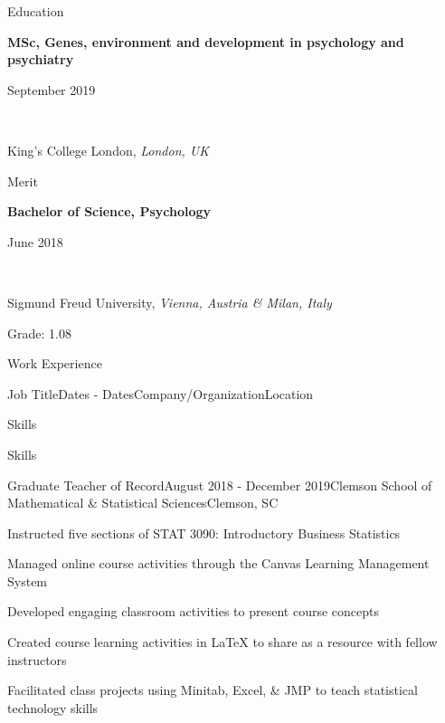 \documentclass{resume2} %
\newcommand\textbox[1]{%
  \parbox{.48\textwidth}{#1}%
}
\begin{document}
\thispagestyle{plain}



\begin{rSection}{Education}



\textbox{\textbf{MSc, Genes, environment and development in psychology and psychiatry}\hfill}\textbox{\hfill September 2019}\\
\textbox{King's College London, \textit{London, UK}\hfill}{\hfill Merit}

\textbox{\textbf{Bachelor of Science, Psychology}\hfill}\textbox{\hfill June 2018}\\
\textbox{Sigmund Freud University, \textit{Vienna, Austria \& Milan, Italy}}{\hfill Grade: 1.08}


\end{rSection}


\begin{rSection}{Work Experience}


\begin{rSubsection}{Job Title}{Dates - Dates}{Company/Organization}{Location}
\item Skills
\item Skills
\end{rSubsection}

\begin{rSubsection}{Graduate Teacher of Record}{August 2018 - December 2019}{Clemson School of Mathematical \& Statistical Sciences}{Clemson, SC}
\item Instructed five sections of STAT 3090: Introductory Business Statistics
\item Managed online course activities through the Canvas Learning Management System
\item Developed engaging classroom activities to present course concepts
\item Created course learning activities in \LaTeX \hspace{.1mm} to share as a resource with fellow instructors
\item Facilitated class projects using Minitab, Excel, \& JMP to teach statistical technology skills
\end{rSubsection}

\end{rSection}
\end{document}

